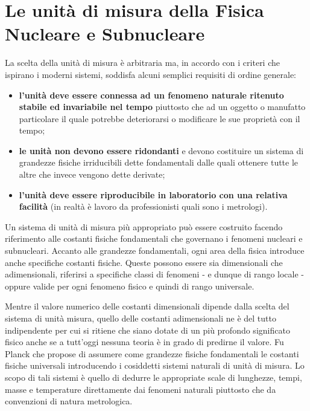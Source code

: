 
\section{Le unità di misura della Fisica Nucleare e Subnucleare}
\label{sec:unita-di-misura}

La scelta della unità di misura è arbitraria ma, in accordo con i criteri che ispirano i moderni sistemi, soddisfa
alcuni semplici requisiti di ordine generale:
\begin{itemize}
    \item  \textbf{l'unità deve essere connessa ad un fenomeno naturale ritenuto stabile ed invariabile nel tempo} piuttosto che ad un oggetto o manufatto particolare il quale potrebbe deteriorarsi o modificare le sue proprietà con il tempo;
    \item  \textbf{le unità non devono essere ridondanti} e devono costituire un sistema di grandezze fisiche irriducibili dette fondamentali dalle quali ottenere tutte le altre che invece vengono dette derivate;
    \item  \textbf{l'unità deve essere riproducibile in laboratorio con una relativa facilità} (in realtà è lavoro da professionisti quali sono i metrologi).
\end{itemize}

Un sistema di unità di misura più appropriato può essere costruito facendo riferimento alle costanti fisiche fondamentali che governano i fenomeni nucleari e subnucleari.
Accanto alle grandezze fondamentali, ogni area della fisica introduce anche specifiche costanti fisiche.
Queste possono essere sia dimensionali che adimensionali, riferirsi a specifiche classi di fenomeni - e dunque di rango locale - oppure valide per ogni fenomeno fisico e quindi di rango universale.

Mentre il valore numerico delle costanti dimensionali dipende dalla scelta del sistema di unità misura, quello delle
costanti adimensionali ne è del tutto indipendente per cui si ritiene che siano dotate di un più profondo significato
fisico anche se a tutt’oggi nessuna teoria è in grado di predirne il valore.
Fu Planck che propose di assumere come grandezze fisiche fondamentali le costanti fisiche universali introducendo i
cosiddetti sistemi naturali di unità di misura.
Lo scopo di tali sistemi è quello di dedurre le appropriate scale di lunghezze, tempi, masse e temperature direttamente
dai fenomeni naturali piuttosto che da convenzioni di natura metrologica.

